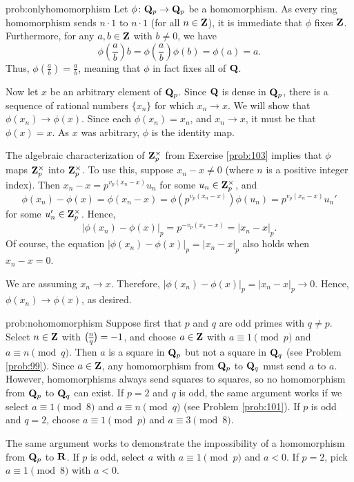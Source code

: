 \begin{sol}{prob:onlyhomomorphism} Let $\phi\colon \mathbf{Q}_p\to \mathbf{Q}_p$ be a homomorphism. As every ring homomorphism sends $n\cdot 1$ to $n\cdot 1$ (for all $n \in \mathbf{Z}$), it is immediate that $\phi$ fixes $\mathbf{Z}$. Furthermore, for any $a, b \in \mathbf{Z}$ with $b \ne 0$, we have
\[ \phi\left(\frac{a}{b}\right) b = \phi\left(\frac{a}{b}\right)\phi(b) =  \phi(a) = a. \]
Thus, $\phi\left(\frac{a}{b}\right)=\frac{a}{b}$, meaning that $\phi$ in fact fixes all of $\mathbf{Q}$.

Now let $x$ be an arbitrary element of $\mathbf{Q}_p$. Since $\mathbf{Q}$ is dense in $\mathbf{Q}_p$, there is a sequence of rational numbers $\{x_n\}$ for which $x_n \to x$. We will show that $\phi(x_n) \to \phi(x)$. Since each $\phi(x_n) = x_n$, and $x_n\to x$, it must be that $\phi(x)=x$. As $x$ was arbitrary, $\phi$ is the identity map.

The algebraic characterization of $\mathbf{Z}_p^{\times}$ from Exercise \ref{prob:103} implies that $\phi$ maps $\mathbf{Z}_{p}^{\times}$ into $\mathbf{Z}_p^{\times}$.  To use this, suppose $x_n-x \ne 0$ (where $n$ is a positive integer index). Then $x_n - x = p^{v_p(x_n-x)} u_n$ for some $u_n \in \mathbf{Z}_p^{\times}$, and
\[ \phi(x_n) - \phi(x) = \phi(x_n - x) = \phi(p^{v_p(x_n-x)}) \phi(u_n) = p^{v_p(x_n-x)} u_n' \]
for some $u_n' \in \mathbf{Z}_{p}^{\times}$. Hence, $$|\phi(x_n)-\phi(x)|_p = p^{-v_p(x_n-x)} = |x_n-x|_p.$$ Of course, the equation $|\phi(x_n)-\phi(x)|_p = |x_n-x|_p$ also holds when $x_n-x=0$.

We are assuming $x_n\to x$. Therefore, $|\phi(x_n)-\phi(x)|_p = |x_n-x|_p \to 0$. Hence, $\phi(x_n)\to \phi(x)$, as desired.
\end{sol}

\begin{sol}{prob:nohomomorphism} Suppose first that $p$ and $q$ are odd primes with $q\ne p$. Select $n\in \mathbf{Z}$ with $\legendre{n}{q}=-1$, and choose $a\in \mathbf{Z}$ with $a\equiv 1\pmod{p}$ and $a\equiv n\pmod{q}$. Then $a$ is a square in $\mathbf{Q}_p$ but not a square in $\mathbf{Q}_q$ (see Problem \ref{prob:99}). Since $a \in \mathbf{Z}$, any homomorphism from $\mathbf{Q}_p$ to $\mathbf{Q}_q$ must send $a$ to $a$. However, homomorphisms always send squares to squares, so no homomorphism from $\mathbf{Q}_p$ to $\mathbf{Q}_q$ can exist.  If $p=2$ and $q$ is odd, the same argument works if we select $a\equiv 1\pmod{8}$ and $a\equiv n\pmod{q}$ (see Problem \ref{prob:101}). If $p$ is odd and $q=2$, choose $a\equiv1\pmod{p}$ and $a\equiv 3\pmod{8}$. 

The same argument works to demonstrate the impossibility of a homomorphism from $\mathbf{Q}_p$ to $\mathbf{R}$. If $p$ is odd, select $a$ with $a\equiv 1\pmod{p}$ and $a<0$. If $p=2$, pick $a\equiv 1\pmod{8}$ with $a<0$.
\end{sol}


